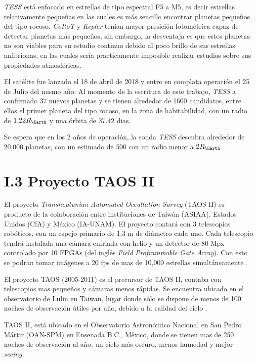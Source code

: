 \textit{TESS} está enfocado en estrellas de tipo espectral F5 a M5, es decir estrellas relativamente pequeñas en las cuales es más sencillo encontrar planetas pequeños del tipo rocoso. \textit{CoRoT} y \textit{Kepler} tenían mayor presición fotométrica capaz de detectar planetas más pequeños, sin embargo, la desventaja es que estos planetas no son viables para su estudio continuo debido al poco brillo de sus estrellas anfitrionas, en las cuales sería practicamente imposible realizar estudios sobre sus propiedades atmosféricas. \cite{sullivan2015transiting} 

El satélite fue lanzado el 18 de abril de 2018 y entro en complata operación el 25 de Julio del mismo año. Al momento de la escritura de este trabajo, \textit{TESS} a confirmado 37 nuevos planetas y se tienen alrededor de 1600 candidatos, entre ellos el primer planeta del tipo rocoso, en la zona de habitabilidad, con un radio de $1.22R_{\Earth}$ y una órbita de 37.42 dias. \cite{gilbert2020first}

Se espera que en los 2 años de operación, la sonda \textit{TESS} descubra alrededor de 20,000 planetas, con un estimado de 500 con un radio menor a $2R_{\Earth}$.

\section*{I.3 Proyecto TAOS II}

El proyecto \textit{Transneptunian Automated Occultation Survey} (TAOS II) es producto de la colaboración entre instituciones de Taiwán (ASIAA), Estados Unidos (CfA) y México (IA-UNAM). El proyecto contará con 3 telescopios robóticos, con un espejo primario de 1.3 m de diámetro cada uno. Cada telescopio tendrá instalada una cámara enfriada con helio y un detector de 80 Mpx controlado por 10 FPGAs (del inglés \textit{Field Proframmable Gate Array}). Con esto se podran tomar imágenes a 20 fps de mas de 10,000 estrellas simultáneamente \cite{lehner2012transneptunian}.

El proyecto TAOS (2005-2011) es el precursor de TAOS II, contaba con telescopios mas pequeños y cámaras menos rápidas. Se encuentra ubicado en el observatorio de Lulin en Taiwan, lugar donde sólo se dispone de menos de 100 noches de observación útiles por año, debido a la calidad del cielo \cite{lehner2010taos}.

TAOS II, está ubicado en el Observatorio Astronómico Nacional en San Pedro Mártir (OAN-SPM) en Ensenada B.C., México, donde se tienen mas de 250 noches de observación al año, un cielo más oscuro, menor humedad y mejor \textit{seeing}.

